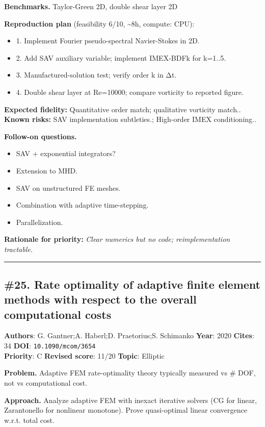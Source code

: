 \documentclass[10pt,letterpaper]{article}
\begin{document}
\textbf{Benchmarks.} Taylor-Green 2D, double shear layer 2D

\textbf{Reproduction plan} (feasibility 6/10, \textasciitilde8h, compute: CPU):
\begin{itemize}
\item 1. Implement Fourier pseudo-spectral Navier-Stokes in 2D.
\item 2. Add SAV auxiliary variable; implement IMEX-BDFk for k=1..5.
\item 3. Manufactured-solution test; verify order k in Δt.
\item 4. Double shear layer at Re=10000; compare vorticity to reported figure.
\end{itemize}
\textbf{Expected fidelity:} Quantitative order match; qualitative vorticity match.. \textbf{Known risks:} SAV implementation subtleties.; High-order IMEX conditioning..

\textbf{Follow-on questions.}
\begin{itemize}
\item SAV + exponential integrators?
\item Extension to MHD.
\item SAV on unstructured FE meshes.
\item Combination with adaptive time-stepping.
\item Parallelization.
\end{itemize}

\textbf{Rationale for priority:} \emph{Clear numerics but no code; reimplementation tractable.}

\medskip\hrule\medskip

\subsection*{\#25. Rate optimality of adaptive finite element methods with respect to the overall computational costs}
\textbf{Authors}: G. Gantner;A. Haberl;D. Praetorius;S. Schimanko \textbullet{} \textbf{Year}: 2020 \textbullet{} \textbf{Cites}: 34 \textbullet{} \textbf{DOI}: \texttt{10.1090/mcom/3654} \\
\textbf{Priority}: C \textbullet{} \textbf{Revised score}: 11/20 \textbullet{} \textbf{Topic}: Elliptic

\textbf{Problem.} Adaptive FEM rate-optimality theory typically measured vs \# DOF, not vs computational cost.

\textbf{Approach.} Analyze adaptive FEM with inexact iterative solvers (CG for linear, Zarantonello for nonlinear monotone). Prove quasi-optimal linear convergence w.r.t. total cost.
\end{document}
